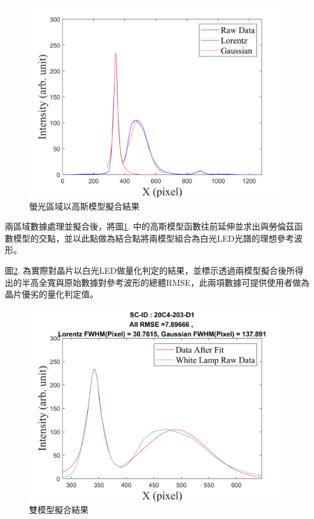 \begin{figure}[H] %
	\centering %
	\includegraphics[width=16cm]{figures/white_gaussian.png} %
	\caption{螢光區域以高斯模型擬合結果} %
	\label{螢光區域以高斯模型擬合結果} %
\end{figure}
兩區域數據處理並擬合後，將圖\ref{螢光區域以高斯模型擬合結果}. 中的高斯模型函數往前延伸並求出與勞倫茲函數模型的交點，並以此點做為結合點將兩模型組合為白光LED光譜的理想參考波形。\par
圖\ref{雙模型擬合結果}. 為實際對晶片以白光LED做量化判定的結果，並標示透過兩模型擬合後所得出的半高全寬與原始數據對參考波形的總體RMSE，此兩項數據可提供使用者做為晶片優劣的量化判定值。
\begin{figure}[H] %
	\centering %
	\includegraphics[width=\textwidth]{figures/20C4-203-D1.png} %
	\caption{雙模型擬合結果} %
	\label{雙模型擬合結果} %
\end{figure}